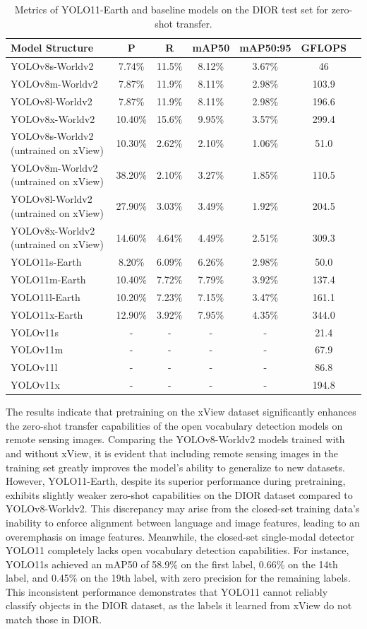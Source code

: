 \documentclass{article}
\begin{document}
\begin{table}[ht]
\centering
\caption{Metrics of YOLO11-Earth and baseline models on the DIOR test set for zero-shot transfer.}
\begin{tabular}{lcccccc}
\toprule
\textbf{Model Structure} & \textbf{P} & \textbf{R} & \textbf{mAP50} & \textbf{mAP50:95} & \textbf{GFLOPS} \\
\midrule
YOLOv8s-Worldv2 & 7.74\% & 11.5\% & 8.12\% & 3.67\% & 46 \\
YOLOv8m-Worldv2 & 7.87\% & 11.9\% & 8.11\% & 2.98\% & 103.9 \\
YOLOv8l-Worldv2 & 7.87\% & 11.9\% & 8.11\% & 2.98\% & 196.6 \\
YOLOv8x-Worldv2 & 10.40\% & 15.6\% & 9.95\% & 3.57\% & 299.4 \\
\midrule
YOLOv8s-Worldv2 (untrained on xView) & 10.30\% & 2.62\% & 2.10\% & 1.06\% & 51.0 \\
YOLOv8m-Worldv2 (untrained on xView) & 38.20\% & 2.10\% & 3.27\% & 1.85\% & 110.5 \\
YOLOv8l-Worldv2 (untrained on xView) & 27.90\% & 3.03\% & 3.49\% & 1.92\% & 204.5 \\
YOLOv8x-Worldv2 (untrained on xView) & 14.60\% & 4.64\% & 4.49\% & 2.51\% & 309.3 \\
\midrule
YOLO11s-Earth & 8.20\% & 6.09\% & 6.26\% & 2.98\% & 50.0 \\
YOLO11m-Earth & 10.40\% & 7.72\% & 7.79\% & 3.92\% & 137.4 \\
YOLO11l-Earth & 10.20\% & 7.23\% & 7.15\% & 3.47\% & 161.1 \\
YOLO11x-Earth & 12.90\% & 3.92\% & 7.95\% & 4.35\% & 344.0 \\
\midrule
YOLOv11s & - & - & - & - & 21.4 \\
YOLOv11m & - & - & - & - & 67.9 \\
YOLOv11l & - & - & - & - & 86.8 \\
YOLOv11x & - & - & - & - & 194.8 \\
\bottomrule
\end{tabular}
\end{table}
The results indicate that pretraining on the xView dataset significantly enhances the zero-shot transfer 
capabilities of the open vocabulary detection models on remote sensing images. Comparing the YOLOv8-Worldv2 
models trained with and without xView, it is evident that including remote sensing images in the training set 
greatly improves the model's ability to generalize to new datasets. However, YOLO11-Earth, despite its superior 
performance during pretraining, exhibits slightly weaker zero-shot capabilities on the DIOR dataset compared to 
YOLOv8-Worldv2. This discrepancy may arise from the closed-set training data's inability to enforce alignment 
between language and image features, leading to an overemphasis on image features. Meanwhile, the closed-set 
single-modal detector YOLO11 completely lacks open vocabulary detection capabilities. For instance, YOLO11s 
achieved an mAP50 of 58.9\% on the first label, 0.66\% on the 14th label, and 0.45\% on the 19th label, with 
zero precision for the remaining labels. This inconsistent performance demonstrates that YOLO11 cannot reliably 
classify objects in the DIOR dataset, as the labels it learned from xView do not match those in DIOR.
\end{document}
